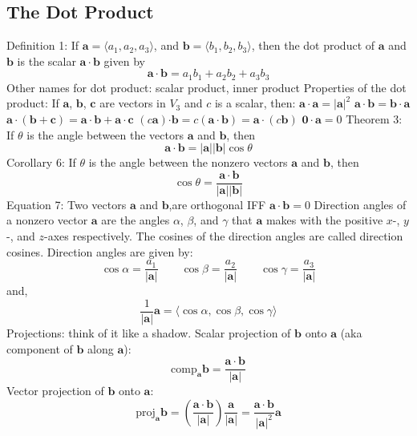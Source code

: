 \documentclass{article}
\begin{document}
    \subsection{The Dot Product}
    \begin{outline}
        \1 Definition 1: If \(\mathbf a=\langle a_1,a_2,a_3\rangle\), and \(\mathbf b=\langle b_1,b_2,b_3\rangle\), then the dot product of \(\mathbf a\) and \(\mathbf b\) is the scalar \(\mathbf{a\cdot b}\) given by \[\mathbf{a\cdot b}=a_1b_1+a_2b_2+a_3b_3\]
        \1 Other names for dot product: scalar product, inner product
        \1 Properties of the dot product: If \(\mathbf a\), \(\mathbf b\), \(\mathbf c\) are vectors in \(V_3\) and $c$ is a scalar, then: 
            \2 \(\mathbf{a\cdot a}=|\mathbf a|^2\)
            \2 \(\mathbf{a\cdot b}=\mathbf{b\cdot a}\)
            \2 \(\mathbf{a\cdot}(\mathbf{b+c})=\mathbf{a\cdot b+a\cdot c}\)
            \2 \((c\mathbf a)\mathbf{\cdot b}=c(\mathbf{a\cdot b})=\mathbf{a\cdot}(c\mathbf b)\)
            \2 \(\mathbf{0\cdot a}=0\)
        \1 Theorem 3: If \(\theta\) is the angle between the vectors \(\mathbf a\) and \(\mathbf b\), then \[\mathbf{a\cdot b}=|\mathbf a||\mathbf b|\cos\theta\]
        \1 Corollary 6: If \(\theta\) is the angle between the nonzero vectors \(\mathbf a\) and \(\mathbf b\), then \[\cos\theta=\dfrac{\mathbf{a\cdot b}}{|\mathbf a||\mathbf b|}\]
        \1 Equation 7: Two vectors \(\mathbf a\) and \(\mathbf b\),are orthogonal IFF \(\mathbf{a\cdot b}=0\)
        \1 Direction angles of a nonzero vector \(\mathbf a\) are the angles \(\alpha\), \(\beta\), and \(\gamma\) that \(\mathbf a\) makes with the positive \(x\)-, \(y\)-, and \(z\)-axes respectively. The cosines of the direction angles are called direction cosines. 
        \1 Direction angles are given by: \[\cos\alpha=\dfrac{a_1}{|\mathbf a|}\qquad\cos\beta=\dfrac{a_2}{|\mathbf a|}\qquad\cos\gamma=\dfrac{a_3}{|\mathbf a|}\] and, \[\dfrac{1}{|\mathbf a|}\mathbf a=\langle\cos\alpha,\cos\beta,\cos\gamma\rangle\]
        \1 Projections: think of it like a shadow. 
        \1 Scalar projection of \(\mathbf b\) onto \(\mathbf a\) (aka component of \(\mathbf b\) along \(\mathbf{a}\)): \[\text{comp}_{\mathbf a}\mathbf b=\dfrac{\mathbf{a\cdot b}}{|\mathbf a|}\]
        \1 Vector projection of \(\mathbf b\) onto \(\mathbf a\): \[\text{proj}_{\mathbf a}\mathbf b=\left(\dfrac{\mathbf{a\cdot b}}{|\mathbf a|}\right)\dfrac{\mathbf a}{|\mathbf a|}=\dfrac{\mathbf{a\cdot b}}{|\mathbf a|^2}\mathbf a\]

    \end{outline} 
\end{document}
